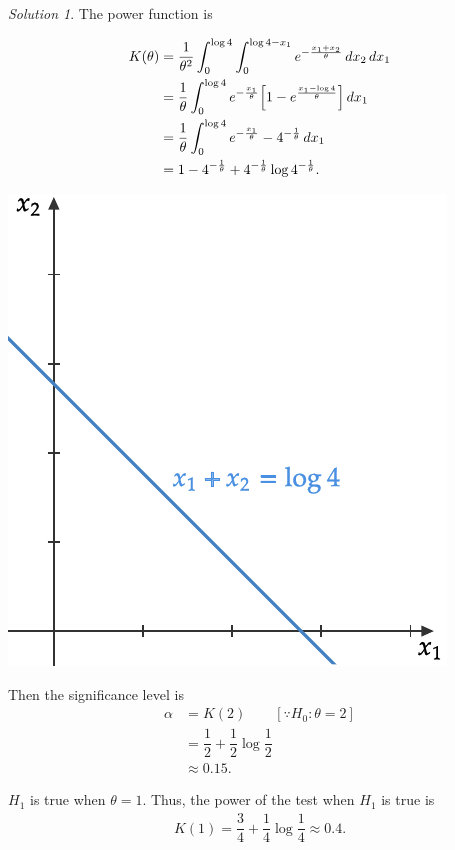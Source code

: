 \documentclass[svgnames, a5paper]{article}
\theoremstyle{definition}
\theoremstyle{remark}
\newtheorem*{Solution*}{Solution}
\begin{document}
\begin{enumerate}
\begin{Solution*}
The power function is\\
\begin{minipage}[h]{0.5\linewidth}
\begin{align*}
K(\theta) &= \dfrac 1 {\theta^2} \int_0^{\log 4} \int_0^{\log 4 - x_1} e^{-\frac{x_1 + x_2}{\theta}} \,dx_2 \,dx_1 \\
	&= \dfrac 1 \theta \int_0^{\log 4} e^{-\frac {x_1} \theta} \bqty{ 1 - e^{\frac{x_1 - \log 4}{\theta}} } \,dx_1 \\
	& = \dfrac 1 \theta \int_0^{\log 4} e^{-\frac {x_1} \theta} - 4^{- \frac 1 \theta} \,dx_1\\
	& = 1 - 4^{- \frac 1 \theta}  + 4^{- \frac 1 \theta} \log 4^{- \frac 1 \theta}.
\end{align*}
\end{minipage}\qquad
\begin{minipage}{0.4\linewidth}
\includegraphics[width=0.8\linewidth]{"x + y = log 4.pdf"}
\end{minipage}

Then the significance level is
\begin{align*}
\alpha & = K(2) \qquad [\because H_0 \colon \theta = 2]\\
	& =\dfrac 1 2 + \dfrac 1 2 \log \dfrac 1 2\\
	& \approx 0.15.
\end{align*}

$H_1$ is true when $\theta = 1$. Thus, the power of the test when $H_1$ is true is
\begin{align*}
K(1) = \dfrac 3 4 + \dfrac 1 4\log \dfrac 1 4 \approx 0.4. 
\end{align*}
\end{Solution*}


\end{enumerate}
\end{document}
